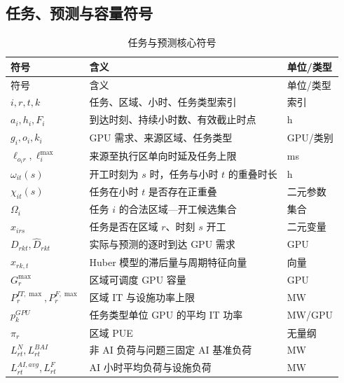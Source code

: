 \documentclass[withoutpreface,bwprint]{cumcmthesis}
\begin{document}
\subsection{任务、预测与容量符号}
\begin{longtable}{p{}p{}p{}}
\caption{任务与预测核心符号}\label{tab:symbol-task}\\
\toprule 符号 & 含义 & 单位/类型\\ \midrule\endfirsthead
\toprule 符号 & 含义 & 单位/类型\\ \midrule\endhead
\bottomrule\endfoot
$i,r,t,k$ & 任务、区域、小时、任务类型索引 & 索引\\
$a_i,h_i,F_i$ & 到达时刻、持续小时数、有效截止时点 & h\\
$g_i,o_i,k_i$ & GPU 需求、来源区域、任务类型 & GPU/类别\\
$\ell_{o_ir},\ell_i^{\max}$ & 来源至执行区单向时延及任务上限 & ms\\
$\omega_{it}(s)$ & 开工时刻为 $s$ 时，任务与小时 $t$ 的重叠时长 & h\\
$\chi_{it}(s)$ & 任务在小时 $t$ 是否存在正重叠 & 二元参数\\
$\Omega_i$ & 任务 $i$ 的合法区域—开工候选集合 & 集合\\
$x_{irs}$ & 任务是否在区域 $r$、时刻 $s$ 开工 & 二元变量\\
$D_{rkt},\widehat D_{rkt}$ & 实际与预测的逐时到达 GPU 需求 & GPU\\
$x_{rk,t}$ & Huber 模型的滞后量与周期特征向量 & 向量\\
$G_r^{\max}$ & 区域可调度 GPU 容量 & GPU\\
$P_r^{IT,\max},P_r^{F,\max}$ & 区域 IT 与设施功率上限 & MW\\
$p_k^{GPU}$ & 任务类型单位 GPU 的平均 IT 功率 & MW/GPU\\
$\pi_r$ & 区域 PUE & 无量纲\\
$L_{rt}^{N},L_{rt}^{BAI}$ & 非 AI 负荷与问题三固定 AI 基准负荷 & MW\\
$L_{rt}^{AI,avg},L_{rt}^{F}$ & AI 小时平均负荷与设施负荷 & MW\\
\end{longtable}
\end{document}
